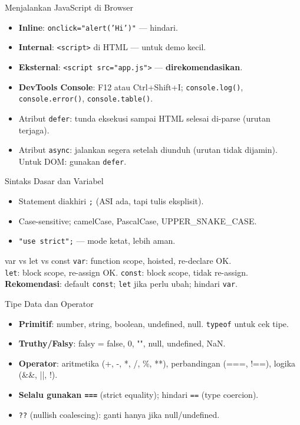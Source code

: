 \documentclass[handout]{beamer}
\begin{document}
\begin{frame}{Menjalankan JavaScript di Browser}
	\begin{itemize}
		\item \textbf{Inline}: \texttt{onclick="alert('Hi')"} --- hindari.
		\item \textbf{Internal}: \texttt{<script>} di HTML --- untuk demo kecil.
		\item \textbf{Eksternal}: \texttt{<script src="app.js">} --- \textbf{direkomendasikan}.
		\item \textbf{DevTools Console}: F12 atau Ctrl+Shift+I; \texttt{console.log()}, \texttt{console.error()}, \texttt{console.table()}.
		\item Atribut \texttt{defer}: tunda eksekusi sampai HTML selesai di-parse (urutan terjaga).
		\item Atribut \texttt{async}: jalankan segera setelah diunduh (urutan tidak dijamin). Untuk DOM: gunakan \texttt{defer}.
	\end{itemize}
\end{frame}

\begin{frame}{Sintaks Dasar dan Variabel}
	\begin{itemize}
		\item Statement diakhiri \texttt{;} (ASI ada, tapi tulis eksplisit).
		\item Case-sensitive; camelCase, PascalCase, UPPER\_SNAKE\_CASE.
		\item \texttt{"use strict";} --- mode ketat, lebih aman.
	\end{itemize}
	\begin{block}{var vs let vs const}
		\texttt{var}: function scope, hoisted, re-declare OK. \\
		\texttt{let}: block scope, re-assign OK. \texttt{const}: block scope, tidak re-assign. \\
		\textbf{Rekomendasi}: default \texttt{const}; \texttt{let} jika perlu ubah; hindari \texttt{var}.
	\end{block}
\end{frame}

\begin{frame}{Tipe Data dan Operator}
	\begin{itemize}
		\item \textbf{Primitif}: number, string, boolean, undefined, null. \texttt{typeof} untuk cek tipe.
		\item \textbf{Truthy/Falsy}: falsy = false, 0, "", null, undefined, NaN.
		\item \textbf{Operator}: aritmetika (+, -, *, /, \%, **), perbandingan (===, !==), logika (\&\&, ||, !).
		\item \textbf{Selalu gunakan \texttt{===}} (strict equality); hindari \texttt{==} (type coercion).
		\item \texttt{??} (nullish coalescing): ganti hanya jika null/undefined.
	\end{itemize}
\end{frame}
\end{document}
